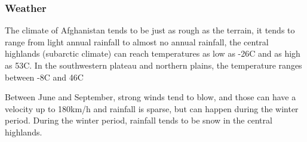 \subsubsection*{Weather}

The climate of Afghanistan tends to be just as rough as the terrain, it tends to range from light annual rainfall to almost no annual rainfall, the central highlands (subarctic climate) can reach temperatures as low as -26\textdegree C and as high as 53\textdegree C. In the southwestern plateau and northern plains, the temperature ranges between -8\textdegree C and 46\textdegree C 

\vspace{2mm}

Between June and September, strong winds tend to blow, and those can have a velocity up to 180km/h and rainfall is sparse, but can happen during the winter period. During the winter period, rainfall tends to be snow in the central highlands. \cite{ellicott2003junior}


